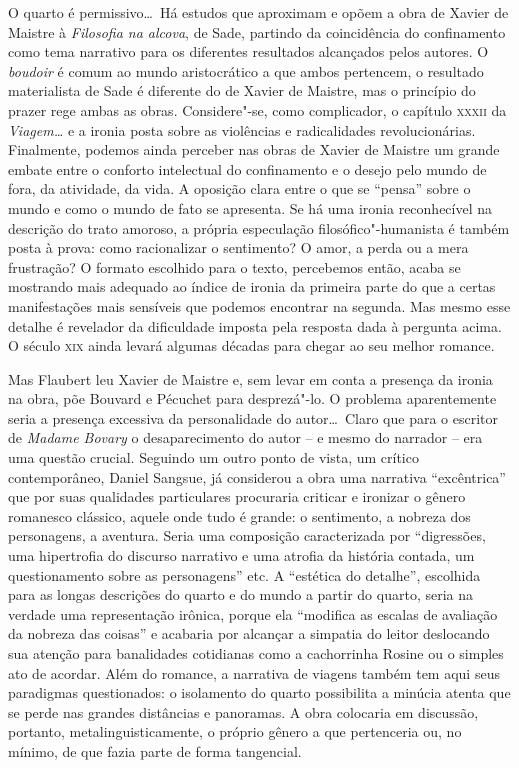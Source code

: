 O quarto é permissivo\ldots\  Há estudos que aproximam e opõem a obra de
Xavier de Maistre à \textit{Filosofia na alcova}, de Sade, partindo da
coincidência do confinamento como tema narrativo para os diferentes
resultados alcançados pelos autores. O \textit{boudoir} é comum ao
mundo aristocrático a que ambos pertencem, o resultado materialista de
Sade é diferente do de Xavier de Maistre, mas o princípio do prazer
rege ambas as obras. Considere"-se, como complicador, o capítulo \textsc{xxxii}
da \textit{Viagem\ldots} e a ironia posta sobre as violências e
radicalidades revolucionárias. Finalmente, podemos ainda perceber nas
obras de Xavier de Maistre um grande embate entre o conforto
intelectual do confinamento e o desejo pelo mundo de fora, da
atividade, da vida. A oposição clara entre o que se ``pensa'' sobre o
mundo e como o mundo de fato se apresenta. Se há uma ironia
reconhecível na descrição do trato amoroso, a própria especulação
filosófico"-humanista é também posta à prova: como racionalizar o
sentimento? O amor, a perda ou a mera frustração? O formato escolhido
para o texto, percebemos então, acaba se mostrando mais adequado ao
índice de ironia da primeira parte do que a certas manifestações mais
sensíveis que podemos encontrar na segunda. Mas mesmo esse detalhe é
revelador da dificuldade imposta pela resposta dada à pergunta acima. O
século \textsc{xix} ainda levará algumas décadas para chegar ao seu melhor
romance.

Mas Flaubert leu Xavier de Maistre e, sem levar em conta a presença da
ironia na obra, põe Bouvard e Pécuchet para desprezá"-lo. O problema
aparentemente seria a presença excessiva da personalidade do autor\ldots\
Claro que para o escritor de \textit{Madame Bovary} o desaparecimento
do autor -- e mesmo do narrador -- era uma questão crucial. Seguindo
um outro ponto de vista, um crítico contemporâneo, Daniel Sangsue, já considerou a obra
uma narrativa ``excêntrica'' que por suas qualidades particulares
procuraria criticar e ironizar o gênero romanesco clássico, aquele onde
tudo é grande: o sentimento, a nobreza dos personagens, a aventura.
Seria uma composição caracterizada por ``digressões, uma hipertrofia do
discurso narrativo e uma atrofia da história contada, um questionamento
sobre as personagens'' etc. A ``estética do detalhe'', escolhida para as
longas descrições do quarto e do mundo a partir do quarto, seria na
verdade uma representação irônica, porque ela ``modifica as escalas de
avaliação da nobreza das coisas'' e acabaria por alcançar a simpatia do
leitor deslocando sua atenção para banalidades cotidianas como a
cachorrinha Rosine ou o simples ato de acordar. Além do romance, a
narrativa de viagens também tem aqui seus paradigmas questionados: o
isolamento do quarto possibilita a minúcia atenta que se perde nas
grandes distâncias e panoramas. A obra colocaria em discussão,
portanto, metalinguisticamente, o próprio gênero a que pertenceria ou,
no mínimo, de que fazia parte de forma tangencial.

